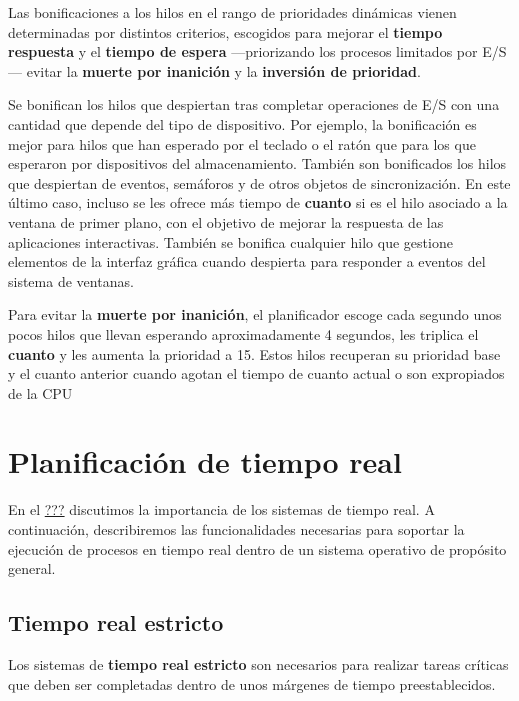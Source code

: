 Las bonificaciones a los hilos en el rango de prioridades dinámicas
vienen determinadas por distintos criterios, escogidos para mejorar el
\textbf{tiempo respuesta} y el \textbf{tiempo de espera} ---priorizando
los procesos limitados por E/S--- evitar la \textbf{muerte por
inanición} y la \textbf{inversión de prioridad}.

Se bonifican los hilos que despiertan tras completar operaciones de E/S
con una cantidad que depende del tipo de dispositivo. Por ejemplo, la
bonificación es mejor para hilos que han esperado por el teclado o el
ratón que para los que esperaron por dispositivos del almacenamiento.
También son bonificados los hilos que despiertan de eventos, semáforos y
de otros objetos de sincronización. En este último caso, incluso se les
ofrece más tiempo de \textbf{cuanto} si es el hilo asociado a la ventana
de primer plano, con el objetivo de mejorar la respuesta de las
aplicaciones interactivas. También se bonifica cualquier hilo que
gestione elementos de la interfaz gráfica cuando despierta para
responder a eventos del sistema de ventanas.

Para evitar la \textbf{muerte por inanición}, el planificador escoge
cada segundo unos pocos hilos que llevan esperando aproximadamente 4
segundos, les triplica el \textbf{cuanto} y les aumenta la prioridad a
15. Estos hilos recuperan su prioridad base y el cuanto anterior cuando
agotan el tiempo de cuanto actual o son expropiados de la CPU

\section{Planificación de tiempo
real}\label{_planificaciuxf3n_de_tiempo_real}

En el \hyperref[_sistemas_de_tiempo_real]{???} discutimos la importancia
de los sistemas de tiempo real. A continuación, describiremos las
funcionalidades necesarias para soportar la ejecución de procesos en
tiempo real dentro de un sistema operativo de propósito general.

\subsection{Tiempo real estricto}\label{_tiempo_real_estricto}

{} {} {} Los sistemas de \textbf{tiempo real estricto} son necesarios
para realizar tareas críticas que deben ser completadas dentro de unos
márgenes de tiempo preestablecidos.

